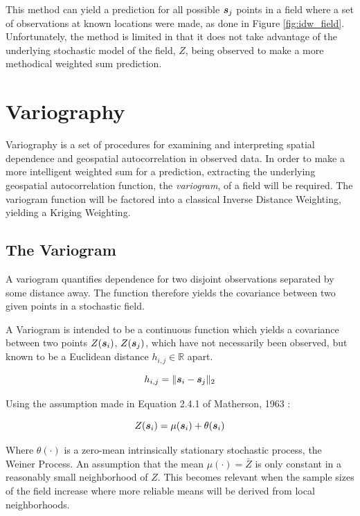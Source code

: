 This method can yield a prediction for all possible ${\it{\boldsymbol{s}}}_j$ points in a field where a set of observations at known locations were made, as done in Figure \ref{fig:idw_field}. Unfortunately, the method is limited in that it does not take advantage of the underlying stochastic model of the field, $Z$, being observed to make a more methodical weighted sum prediction.

\section{Variography} \label{sec:vario}
Variography is a set of procedures for examining and interpreting spatial dependence and geospatial autocorrelation in observed data. In order to make a more intelligent weighted sum for a prediction, extracting the underlying geospatial autocorrelation function, the \textit{variogram}, of a field will be required. The variogram function will be factored into a classical Inverse Distance Weighting, yielding a Kriging Weighting.

\subsection{The Variogram}
A variogram quantifies dependence for two disjoint observations separated by some distance away. The function therefore yields the covariance between two given points in a stochastic field.

A Variogram is intended to be a continuous function which yields a covariance between two points $Z({\it{\boldsymbol{s}}}_{i})$, $Z({\it{\boldsymbol{s}}}_{j})$, which have not necessarily been observed, but known to be a Euclidean distance $h_{i,j} \in \mathbb{R}$ apart. 

\begin{equation}
h_{i,j} = \| {\it{\boldsymbol{s}}}_i - {\it{\boldsymbol{s}}}_j \|_2
\end{equation}

Using the assumption made in Equation 2.4.1 of Matherson, 1963 \cite{matheron:geostat}:

\begin{equation}
    Z({\it{\boldsymbol{s}}}_i)=\mu({\it{\boldsymbol{s}}}_i)+\theta({\it{\boldsymbol{s}}}_i)
    \label{eq:matheron:assum}
\end{equation}

Where $\theta(\cdot)$ is a zero-mean intrinsically stationary stochastic process, the Weiner Process. An assumption that the mean $\mu(\cdot) = \bar{Z}$ is only constant in a reasonably small neighborhood of $Z$. This becomes relevant when the sample sizes of the field increase where more reliable means will be derived from local neighborhoods.

